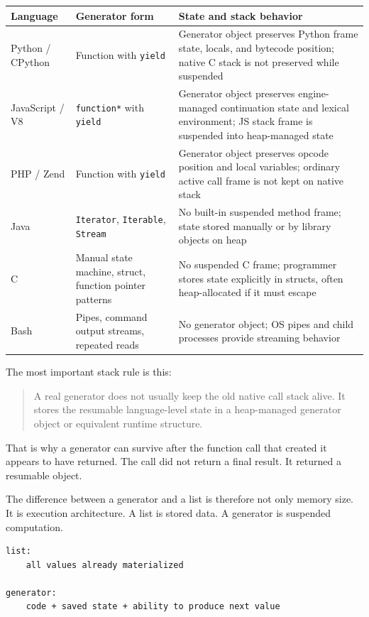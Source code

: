 \begin{center}
\begin{tabular}{|p{}|p{}|p{}|}
\hline
\textbf{Language} & \textbf{Generator form} & \textbf{State and stack behavior} \\
\hline
Python / CPython & Function with \texttt{yield} & Generator object preserves Python frame state, locals, and bytecode position; native C stack is not preserved while suspended \\
\hline
JavaScript / V8 & \texttt{function*} with \texttt{yield} & Generator object preserves engine-managed continuation state and lexical environment; JS stack frame is suspended into heap-managed state \\
\hline
PHP / Zend & Function with \texttt{yield} & Generator object preserves opcode position and local variables; ordinary active call frame is not kept on native stack \\
\hline
Java & \texttt{Iterator}, \texttt{Iterable}, \texttt{Stream} & No built-in suspended method frame; state stored manually or by library objects on heap \\
\hline
C & Manual state machine, struct, function pointer patterns & No suspended C frame; programmer stores state explicitly in structs, often heap-allocated if it must escape \\
\hline
Bash & Pipes, command output streams, repeated reads & No generator object; OS pipes and child processes provide streaming behavior \\
\hline
\end{tabular}
\end{center}

The most important stack rule is this:

\begin{quote}
A real generator does not usually keep the old native call stack alive. It stores the resumable language-level state in a heap-managed generator object or equivalent runtime structure.
\end{quote}

That is why a generator can survive after the function call that created it appears to have returned. The call did not return a final result. It returned a resumable object.

The difference between a generator and a list is therefore not only memory size. It is execution architecture. A list is stored data. A generator is suspended computation.

\begin{verbatim}
list:
    all values already materialized

generator:
    code + saved state + ability to produce next value
\end{verbatim}

